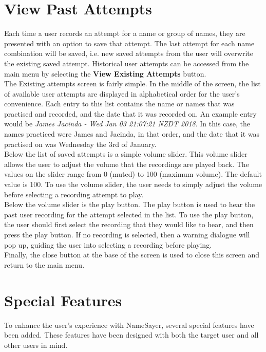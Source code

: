 \documentclass{article}
\begin{document}
\section{View Past Attempts}

Each time a user records an attempt for a name or group of names, they are presented with an option to save that attempt.
The last attempt for each name combination will be saved, i.e. new saved attempts from the user will overwrite the existing saved attempt.
Historical user attempts can be accessed from the main menu by selecting the \textbf{View Existing Attempts} button. \\

The Existing attempts screen is fairly simple. In the middle of the screen, the list of available user attempts are displayed in alphabetical order
for the user's convenience. Each entry to this list contains the name or names that was practised and recorded, and the date that it was
recorded on. An example entry would be {\em James Jacinda - Wed Jan 03 21:07:21 NZDT 2018}. In this case, the names practiced were
James and Jacinda, in that order, and the date that it was practised on was Wednesday the 3rd of January. \\

Below the list of saved attempts is a simple volume slider. This volume slider allows the user to adjust the volume that the 
recordings are played back. The values on the slider range from 0 (muted) to 100 (maximum volume). The default value is 100. To use the 
volume slider, the user needs to simply adjust the volume before selecting a recording attempt to play. \\

Below the volume slider is the play button. The play button is used to hear the past user recording for the attempt selected
in the list. To use the play button, the user should first select the recording that they would like to hear, and then press
the play button. If no recording is selected, then a warning dialogue will pop up, guiding the user into selecting a recording 
before playing. \\

Finally, the close button at the base of the screen is used to close this screen and return to the main menu.


\section{Special Features}
To enhance the user's experience with NameSayer, several special features have been added. These features have been designed
with both the target user and all other users in mind.
\end{document}
